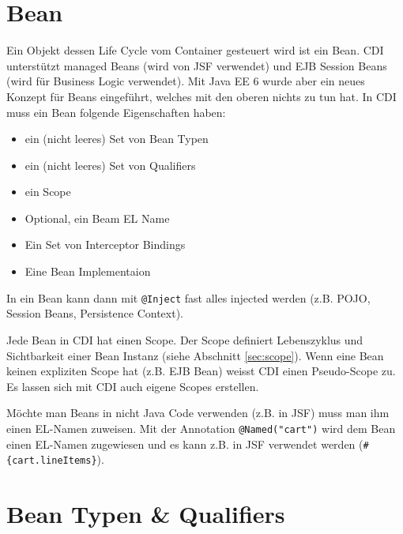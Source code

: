 \section{Bean}

Ein Objekt dessen Life Cycle vom Container gesteuert wird ist ein Bean. CDI unterstützt managed Beans (wird von JSF verwendet) und EJB Session Beans (wird für Business Logic verwendet). Mit Java EE 6 wurde aber ein neues Konzept für Beans eingeführt, welches mit den oberen nichts zu tun hat. In CDI muss ein Bean folgende Eigenschaften haben:
\begin{itemize}
	\item ein (nicht leeres) Set von Bean Typen
	\item ein (nicht leeres) Set von Qualifiers
	\item ein Scope
	\item Optional, ein Beam EL Name
	\item Ein Set von Interceptor Bindings
	\item Eine Bean Implementaion
\end{itemize}
In ein Bean kann dann mit \verb|@Inject| fast alles injected werden (z.B. POJO, Session Beans, Persistence Context). 

Jede Bean in CDI hat einen Scope. Der Scope definiert Lebenszyklus und Sichtbarkeit einer Bean Instanz (siehe Abschnitt \ref{sec:scope}). Wenn eine Bean keinen expliziten Scope hat (z.B. EJB Bean) weisst CDI einen Pseudo-Scope zu. Es lassen sich mit CDI auch eigene Scopes erstellen.

Möchte man Beans in nicht Java Code verwenden (z.B. in JSF) muss man ihm einen EL-Namen zuweisen. Mit der Annotation \verb|@Named("cart")| wird dem Bean einen EL-Namen zugewiesen und es kann z.B. in JSF verwendet werden (\verb|#{cart.lineItems}|).

\section{Bean Typen \& Qualifiers}

